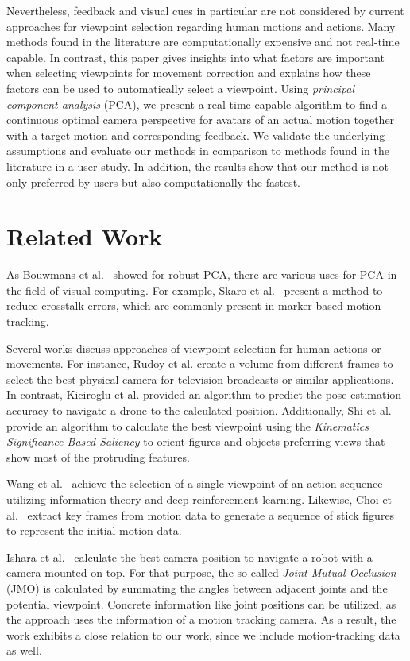 Nevertheless, feedback and visual cues in particular are not considered by current approaches for viewpoint selection regarding human motions and actions. Many methods found in the literature are computationally expensive and not real-time capable. In contrast, this paper gives insights into what factors are important when selecting viewpoints for movement correction and explains how these factors can be used to automatically select a viewpoint. Using \emph{principal component analysis} (PCA), we present a real-time capable algorithm to find a continuous optimal camera perspective for avatars of an actual motion together with a target motion and corresponding feedback. We validate the underlying assumptions and evaluate our methods in comparison to methods found in the literature in a user study. In addition, the results show that our method is not only preferred by users but also computationally the fastest.

\section{Related Work \label{sec:related}}	
As Bouwmans et al.~\cite{bouwmans2018arpca} showed for robust PCA, there are various uses for PCA in the field of visual computing. For example, Skaro et al.~\cite{skaro2021knac} present a method to reduce crosstalk errors, which are commonly present in marker-based motion tracking.

Several works discuss approaches of viewpoint selection for human actions or movements. For instance, Rudoy et al. \cite{rudoy2011vsh} create a volume from different frames to select the best physical camera for television broadcasts or similar applications. In contrast,  Kiciroglu et al. \cite{kiciroglu2020amc} provided an algorithm to predict the pose estimation accuracy to navigate a drone to the calculated position. Additionally, Shi et al. \cite{shi2012ksb} provide an algorithm to calculate the best viewpoint using the \emph{Kinematics Significance Based Saliency} to orient figures and objects preferring views that show most of the protruding features. 

Wang et al.~\cite{wang2019asw} achieve the selection of a single viewpoint of an action sequence utilizing information theory and deep reinforcement learning. Likewise, Choi et al.~\cite{choi2012rav} extract key frames from motion data to generate a sequence of stick figures to represent the initial motion data.

Ishara et al.~\cite{ishara2015mra} calculate the best camera position to navigate a robot with a camera mounted on top. For that purpose, the so-called \emph{Joint Mutual Occlusion} (JMO) is calculated by summating the angles between adjacent joints and the potential viewpoint. Concrete information like joint positions can be utilized, as the approach uses the information of a motion tracking camera. As a result, the work exhibits a close relation to our work, since we include motion-tracking data as well.

